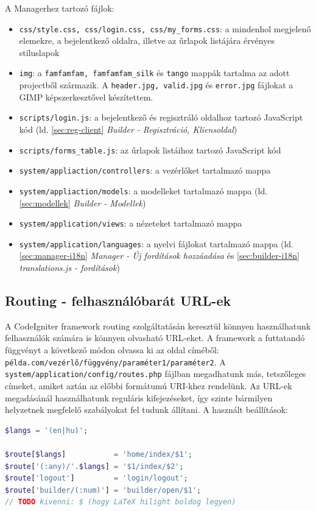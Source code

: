 \documentclass[12pt,a4paper,twoside]{article}
\newcommand{\fitem}[1]{\item \texttt{#1}:}
\begin{document}
A Managerhez tartozó fájlok:

\begin{itemize}
\fitem{css/style.css, css/login.css, css/my\_forms.css} a mindenhol
  megjelenő elemekre, a bejelentkező oldalra, illetve az űrlapok listájára
  érvényes stíluslapok
\fitem{img} a \texttt{famfamfam, famfamfam\_silk} és \texttt{tango}
  mappák tartalma az adott projectből származik. A \texttt{header.jpg,
    valid.jpg} és \texttt{error.jpg} fájlokat a GIMP képszerkesztővel
  készítettem.
\fitem{scripts/login.js} a bejelentkező és regisztráló oldalhoz tartozó
  JavaScript kód (ld. \ref{sec:reg-client} \textit{Builder - Regisztráció,
    Kliensoldal})
\fitem{scripts/forms\_table.js} az űrlapok listáihoz tartozó JavaScript kód
\fitem{system/appliaction/controllers} a vezérlőket tartalmazó mappa
\fitem{system/appliaction/models} a modelleket tartalmazó mappa
(ld. \ref{sec:modellek} \textit{Builder - Modellek})
\fitem{system/application/views} a nézeteket tartalmazó mappa
\fitem{system/application/languages} a nyelvi fájlokat tartalmazó mappa
  (ld. \ref{sec:manager-i18n} \textit{Manager - Új fordítások hozzáadása} és
  \ref{sec:builder-i18n} \textit{translations.js - fordítások})
\end{itemize}

\subsection{Routing - felhasználóbarát URL-ek}

A CodeIgniter framework routing\cite{CI-Routing} szolgáltatásán keresztül
könnyen használhatunk felhasználók számára is könnyen olvasható URL-eket.
A framework a futtatandó függvényt a következő módon olvassa ki az oldal
címéből: \texttt{példa.com/vezérlő/függvény/paraméter1/paraméter2}.
A \texttt{system/application/config/routes.php} fájlban megadhatunk más,
tetszőleges címeket, amiket aztán az előbbi formátumú URI-khez rendelünk. Az
URL-ek megadásánál használhatunk reguláris kifejezéseket\cite{regex}, így szinte
bármilyen helyzetnek megfelelő szabályokat fel tudunk állítani. A használt
beállítások:

\begin{lstlisting}[language=PHP, firstnumber=46]
$langs = '(en|hu)';

$route[$langs]           = 'home/index/$1';
$route['(:any)/'.$langs] = '$1/index/$2';
$route['logout']         = 'login/logout';
$route['builder/(:num)'] = 'builder/open/$1';
// TODO kivenni: $ (hogy LaTeX hilight boldog legyen)
\end{lstlisting}
\end{document}
